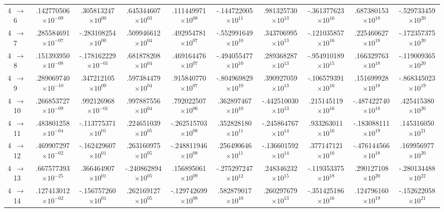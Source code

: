 \documentclass[reviewcopy]{elsarticle}
\begin{document}
\begin{landscape}
\begin{longtable}{lccccccccc}
 4~$\to$~ 6  &   .142770506$\times10^{-09}$ &  .305813247$\times10^{00}$ &  .645344607$\times10^{03}$ &  .111449971$\times10^{08}$ & -.144722005$\times10^{11}$ &  .981325730$\times10^{13}$ & -.361377623$\times10^{16}$ &  .687380153$\times10^{18}$ & -.529733459$\times10^{20}$ \\
 4~$\to$~ 7  &   .285584691$\times10^{-07}$ & -.283108254$\times10^{00}$ &  .509946612$\times10^{04}$ &  .492954781$\times10^{07}$ & -.552991649$\times10^{10}$ &  .343706995$\times10^{13}$ & -.121035857$\times10^{16}$ &  .225460627$\times10^{18}$ & -.172357375$\times10^{20}$ \\
 4~$\to$~ 8  &   .151393950$\times10^{-08}$ & -.178162229$\times10^{-01}$ &  .681878208$\times10^{04}$ &  .469164476$\times10^{07}$ & -.494055477$\times10^{10}$ &  .289368287$\times10^{13}$ & -.954910189$\times10^{15}$ &  .166329763$\times10^{18}$ & -.119009365$\times10^{20}$ \\
 4~$\to$~ 9  &   .289069740$\times10^{-10}$ &  .347212105$\times10^{00}$ &  .597384479$\times10^{04}$ &  .915840770$\times10^{07}$ & -.804969829$\times10^{10}$ &  .390927059$\times10^{13}$ & -.106579391$\times10^{16}$ &  .151699928$\times10^{18}$ & -.868345023$\times10^{19}$ \\
 4~$\to$~ 10 &   .266853727$\times10^{-09}$ &  .992126968$\times10^{-01}$ &  .997887556$\times10^{04}$ &  .792022507$\times10^{06}$ &  .362897467$\times10^{10}$ & -.442510030$\times10^{13}$ &  .215145119$\times10^{16}$ & -.487422740$\times10^{18}$ &  .425415380$\times10^{20}$ \\
 4~$\to$~ 11 &   .483801258$\times10^{-04}$ & -.113775371$\times10^{01}$ &  .224651039$\times10^{05}$ & -.262515703$\times10^{08}$ &  .352828180$\times10^{11}$ & -.245864767$\times10^{14}$ &  .933263011$\times10^{16}$ & -.183088111$\times10^{19}$ &  .145316050$\times10^{21}$ \\
 4~$\to$~ 12 &   .469907297$\times10^{-02}$ & -.162429607$\times10^{01}$ &  .263160975$\times10^{05}$ & -.248811946$\times10^{08}$ &  .256490646$\times10^{11}$ & -.136601592$\times10^{14}$ &  .377147121$\times10^{16}$ & -.476144566$\times10^{18}$ &  .169956977$\times10^{20}$ \\
 4~$\to$~ 13 &   .667577393$\times10^{-25}$ &  .366464907$\times10^{01}$ & -.240862894$\times10^{05}$ &  .156895061$\times10^{09}$ & -.275297247$\times10^{12}$ &  .248346232$\times10^{15}$ & -.119353375$\times10^{18}$ &  .290127108$\times10^{20}$ & -.280134488$\times10^{22}$ \\
 4~$\to$~ 14 &  .127413012$\times10^{-02}$  & -.156757260$\times10^{01}$ &  .262169127$\times10^{05}$ & -.129742699$\times10^{08}$ &  .582879017$\times10^{10}$ &  .260297679$\times10^{13}$ & -.351425186$\times10^{16}$ &  .124796160$\times10^{19}$ & -.152622058$\times10^{21}$ \\

\end{longtable}
\end{landscape}
\end{document}
